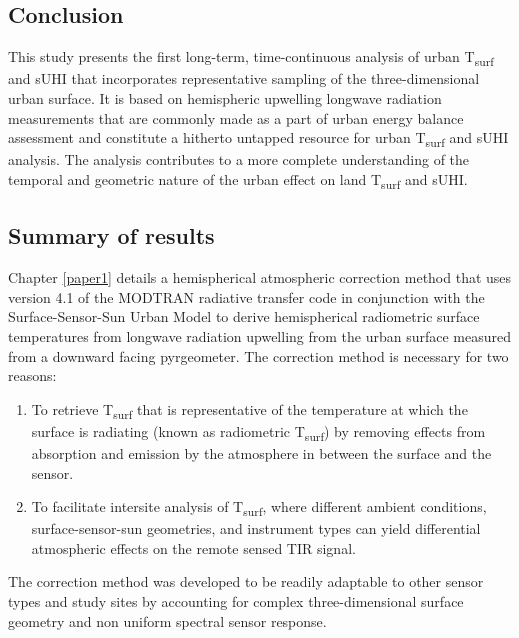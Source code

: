 \begin{bibunit}

\rhead{\thepage}

\chapter{Conclusion}

This study presents the first long-term, time-continuous analysis of urban T\textsubscript{surf} and sUHI that incorporates representative sampling of the three-dimensional urban surface. It is based on hemispheric upwelling longwave radiation measurements that are commonly made as a part of urban energy balance assessment and constitute a hitherto untapped resource for urban T\textsubscript{surf} and sUHI analysis. The analysis contributes to a more complete understanding of the temporal and geometric nature of the urban effect on land T\textsubscript{surf} and sUHI. 

\section{Summary of results}

Chapter \ref{paper1} details a hemispherical atmospheric correction method that uses version 4.1 of the MODTRAN radiative transfer code \citep{Berk1987} in conjunction with the Surface-Sensor-Sun Urban Model \citep{Soux2004} to derive hemispherical radiometric surface temperatures from longwave radiation upwelling from the urban surface measured from a downward facing pyrgeometer. The correction method is necessary for two reasons:

\begin{enumerate}
	\item To retrieve T\textsubscript{surf} that is representative of the temperature at which the surface is radiating (known as radiometric T\textsubscript{surf}) by removing effects from absorption and emission by the atmosphere in between the surface and the sensor.
	\item To facilitate intersite analysis of T\textsubscript{surf}, where different ambient conditions, surface-sensor-sun geometries, and instrument types can yield differential atmospheric effects on the remote sensed TIR signal.
\end{enumerate}

 The correction method was developed to be readily adaptable to other sensor types and study sites by accounting for complex three-dimensional surface geometry and non uniform spectral sensor response. 


\end{bibunit}

